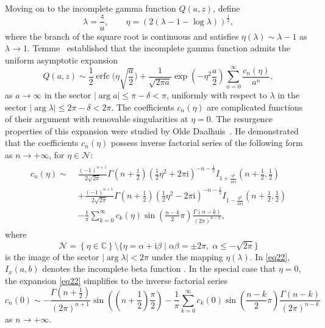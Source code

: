 \documentclass[pdftex]{sigma}
\def\im{\mathrm{i}}
\def\erfc{\operatorname{erfc}}
\numberwithin{equation}{section}
\begin{document}
Moving on to the incomplete gamma function $Q(a,z)$, define
\[
\lambda = \frac{z}{a},\qquad \eta = (2(\lambda - 1 - \log \lambda ))^{\frac{1}{2}} ,
\]
where the branch of the square root is continuous and satisfies $\eta(\lambda)\sim \lambda-1$ as $\lambda\to 1$. Temme~\cite{Temme1979} established that the incomplete gamma function admits the uniform asymptotic expansion
\begin{equation}\label{eq23}
Q(a,z) \sim \frac{1}{2}\erfc\bigg( \eta \sqrt{\frac{a}{2}} \bigg) + \frac{1}{\sqrt{2\pi a} }\exp \left(- \eta ^2 \frac{a}{2}\right)\sum_{n = 0}^\infty \frac{c_n (\eta )}{a^n},
\end{equation}
as $a\to \infty$ in the sector $|\arg a| \le \pi-\delta<\pi$, uniformly with respect to $\lambda$ in the sector $|\arg \lambda| \le 2\pi-\delta<2\pi$. The coefficients $c_n (\eta )$ are complicated functions of their argument with removable singularities at $\eta=0$. The resurgence properties of this expansion were studied by Olde Daalhuis~\cite{OldeDaalhuis1998a}. He demonstrated that the coefficients $c_n (\eta)$ possess inverse factorial series of the following form as $n\to+\infty$, for $\eta \in \mathcal{N}$:
\begin{gather}\label{eq22}
\begin{split}
c_n (\eta ) \sim \; & \frac{( - 1)^{n + 1} }{2\sqrt {2\pi }}\Gamma \left( n + \frac{1}{2} \right)\left( \frac{1}{2}\eta ^2 + 2\pi \im \right)^{ - n - \frac{1}{2}} I_{1 + \frac{\eta ^2 }{4\pi \im}} \left( n + \frac{1}{2},\frac{1}{2} \right)
\\ & + \frac{( - 1)^{n + 1} }{2\sqrt {2\pi } }\Gamma \left( n + \frac{1}{2} \right)\left( \frac{1}{2}\eta ^2 - 2\pi \im \right)^{ - n - \frac{1}{2}} I_{1 - \frac{\eta ^2 }{4\pi \im}} \left( n + \frac{1}{2},\frac{1}{2} \right)
\\ & - \frac{1}{\pi}\sum_{k = 0}^\infty c_k (\eta )\sin \left( \frac{n - k}{2}\pi \right)\frac{\Gamma (n - k)}{(2\pi )^{n - k} },
\end{split}
\end{gather}
where
\[
\mathcal{N} = \left\{ \eta \in \mathbb{C} \right\}\setminus \big\{ \eta = \alpha + \im \beta \mid \alpha \beta = \pm 2\pi ,\; \alpha \le - \sqrt {2\pi}\big\}
\]
is the image of the sector $|\arg \lambda|<2\pi$ under the mapping $\eta(\lambda)$. In \eqref{eq22}, $I_x(a,b)$ denotes the incomplete beta function \cite[Section~8.17]{DLMF}. In the special case that $\eta=0$, the expansion \eqref{eq22} simplifies to the inverse factorial series
\begin{equation}\label{eq19}
c_n (0) \sim -\frac{\Gamma \left( n + \frac{1}{2} \right)}{(2\pi )^{n + 1}}\sin\left( \left( n + \frac{1}{2} \right)\frac{\pi}{2} \right) - \frac{1}{\pi}\sum_{k = 0}^\infty c_k (0)\sin \left( \frac{n - k}{2}\pi \right)\frac{\Gamma (n - k)}{(2\pi )^{n - k} }
\end{equation}
as $n\to+\infty$.
\end{document}
